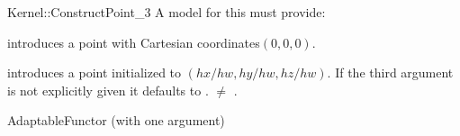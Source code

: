 \begin{ccRefFunctionObjectConcept}{Kernel::ConstructPoint_3}
A model for this must provide:


            {introduces a point with Cartesian coordinates$(0,0,0)$.}

\ccHidden{}
            {introduces a point  initialized to $(hx/hw,hy/hw, hz/hw)$.
             If the third argument is not explicitly given it defaults
             to .
             \ccPrecond {} $\neq$ . }

\ccRefines
AdaptableFunctor (with one argument)

\ccSeeAlso
{} \\

\end{ccRefFunctionObjectConcept}
